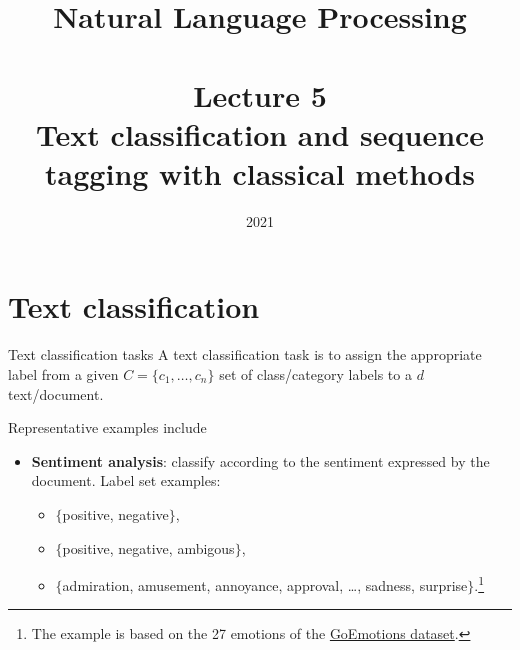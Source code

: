 \documentclass[style=upen, size=14pt]{powerdot}
\newcommand{\gold}{\color{arany}}
\theoremstyle{definition}
\begin{document}
\title{Natural Language Processing\\~~\\Lecture 5\\Text classification and sequence tagging with classical methods}

\date{2021}
\maketitle

\section{Text classification}

\begin{slide}[toc=Tasks]{Text classification tasks}
  A text classification task is to assign the appropriate label from a given
  $C=\{c_1,\dots,c_n\}$ set of class/category labels to a $d$
  text/document.\bigskip

  Representative examples include
  \begin{itemize}
  \item \textbf{\gold Sentiment analysis}: classify according to the sentiment
    expressed by the document. Label set examples:
    \begin{itemize}
    \item  $\{$positive, negative$\}$,
    \item  $\{$positive, negative, ambigous$\}$, 
    \item $\{$admiration, amusement, annoyance, approval, \dots, sadness,
      surprise$\}$.\footnote{The example is based on the 27 emotions of the
        \href{https://arxiv.org/abs/2005.00547}{GoEmotions dataset}.}
    \end{itemize}
  \end{itemize}
\end{slide}
\end{document}
